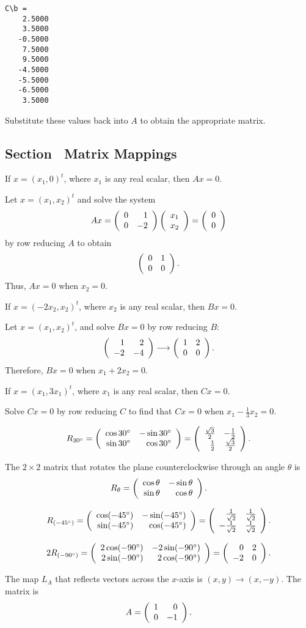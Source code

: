 \documentclass{ximera}
\begin{document}
\begin{verbatim}
C\b =
    2.5000
    3.5000
   -0.5000
    7.5000
    9.5000
   -4.5000
   -5.5000
   -6.5000
    3.5000
\end{verbatim}
Substitute these values back into $A$ to obtain the appropriate matrix.


\subsection*{Section~\protect{\ref{s:4.2}} Matrix Mappings}

\ans If $x = (x_1,0)^t$, where $x_1$ is any real scalar, then $Ax = 0$.

\soln Let $x = (x_1,x_2)^t$ and solve the system
\[
Ax = \left(\begin{array}{rr} 0 & 1\\ 0 &-2\end{array}\right)\left(\begin{array}{r} x_1 \\ x_2\end{array}\right) = \left(\begin{array}{r} 0 \\ 0\end{array}\right)
\]
by row reducing $A$ to obtain
\[
\left(\begin{array}{rr} 0 & 1\\ 0 &0\end{array}\right).
\]
Thus, $Ax = 0$ when $x_2 = 0$.

 \ans  If $x = (-2x_2,x_2)^t$, where $x_2$ is any real
scalar, then $Bx = 0$.

\soln Let $x = (x_1,x_2)^t$, and solve $Bx = 0$ by row reducing $B$:
\[
\left(\begin{array}{rr} 1 & 2\\ -2 &-4\end{array}\right) \longrightarrow \left(\begin{array}{rr} 1 & 2\\ 0 &0\end{array}\right).
\]
Therefore, $Bx = 0$ when $x_1 + 2x_2 = 0$.

\ans If $x = (x_1,3x_1)^t$, where $x_1$ is any real scalar, then $Cx = 0$.

\soln Solve $Cx = 0$ by row reducing $C$ to find that $Cx = 0$ when
$x_1 - \frac{1}{3}x_2 = 0$.

 \ans
\[ R_{30^\circ} = \left(\begin{array}{rr} \cos 30^\circ & -\sin 30^\circ\\ \sin 30^\circ &\cos 30^\circ\end{array}\right) =
\left(\begin{array}{rr} \frac{\sqrt{3}}{2} & -\frac{1}{2}\\ \frac{1}{2} &\frac{\sqrt{3}}{2}\end{array}\right).
\]

\soln The $2\times 2$ matrix that rotates the plane counterclockwise
through an angle $\theta$ is
\[
R_{\theta} = \left(\begin{array}{rr} \cos \theta & -\sin \theta\\ \sin \theta &\cos \theta\end{array}\right).
\]

\newpage
{} \ans
\[
R_{(-45^\circ)} = \left(\begin{array}{rr} \cos (-45^\circ) & -\sin
(-45^\circ)\\ \sin (-45^\circ) &\cos (-45^\circ)\end{array}\right) =
\left(\begin{array}{rr} \frac{1}{\sqrt{2}} & \frac{1}{\sqrt{2}}\\ -\frac{1}{\sqrt{2}} &\frac{1}{\sqrt{2}}\end{array}\right).
\]

 \ans
\[
2R_{(-90^\circ)} = \left(\begin{array}{rr} 2\cos (-90^\circ) & -2\sin
(-90^\circ)\\ 2\sin (-90^\circ) &2\cos (-90^\circ)\end{array}\right) = \left(\begin{array}{rr} 0 & 2\\ -2 &0\end{array}\right).
\]

 The map $L_A$ that reflects vectors across the $x$-axis is
$(x,y) \rightarrow (x,-y)$.  The matrix is
\[
A = \left(\begin{array}{rr} 1 & 0\\ 0 &-1\end{array}\right).
\]
\end{document}
